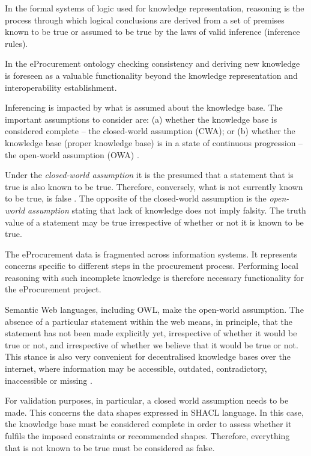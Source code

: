 	In the formal systems of logic used for knowledge representation, reasoning is the process through which logical conclusions are derived from a set of premises known to be true or assumed to be true by the laws of valid inference (inference rules). 
	
	In the eProcurement ontology checking consistency and deriving new knowledge is foreseen as a valuable functionality beyond the knowledge representation and interoperability establishment.
	
	Inferencing is impacted by what is assumed about the knowledge base. The important assumptions to consider are: (a) whether the knowledge base is considered complete -- the closed-world assumption (CWA); or (b) whether the knowledge base (proper knowledge base) is in a state of continuous progression -- the open-world assumption (OWA) \cite{damasio2006supporting}.
	
	Under the \textit{closed-world assumption} it is the presumed that a statement that is true is also known to be true. Therefore, conversely, what is not currently known to be true, is false \citep{reiter1981closed}.
	The opposite of the closed-world assumption is the \textit{open-world assumption} stating that lack of knowledge does not imply falsity. The truth value of a statement may be true irrespective of whether or not it is known to be true. 
		
	The eProcurement data is fragmented across information systems. It represents concerns specific to different steps in the procurement process. Performing local reasoning with such incomplete knowledge is therefore necessary functionality for the eProcurement project. 
		
	Semantic Web languages, including OWL, make the open-world assumption. The absence of a particular statement within the web means, in principle, that the statement has not been made explicitly yet, irrespective of whether it would be true or not, and irrespective of whether we believe that it would be true or not. This stance is also very convenient for decentralised knowledge bases over the internet, where information may be accessible, outdated, contradictory, inaccessible or missing \cite{damasio2006supporting}. 
	
	For validation purposes, in particular, a closed world assumption needs to be made. This concerns the data shapes expressed in SHACL language. In this case, the knowledge base must be considered complete in order to assess whether it fulfils the imposed constraints or recommended shapes. Therefore, everything that is not known to be true must be considered as false. 
	
